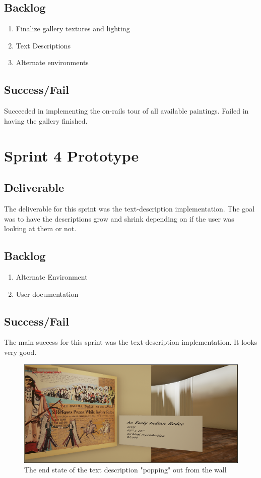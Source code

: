 \subsection{Backlog}
\begin{enumerate}
	\item Finalize gallery textures and lighting
	\item Text Descriptions
	\item Alternate environments
\end{enumerate}
\subsection{Success/Fail}
Succeeded in implementing the on-rails tour of all available paintings.  Failed in having the gallery finished.

\section{Sprint 4 Prototype}
\subsection{Deliverable}
The deliverable for this sprint was the text-description implementation.  The goal was to have the descriptions grow and shrink depending on if the user was looking at them or not.

\subsection{Backlog}
\begin{enumerate}
	\item Alternate Environment
	\item User documentation
\end{enumerate}
\subsection{Success/Fail}
The main success for this sprint was the text-description implementation.  It looks very good.
\begin{figure}
\centering
\includegraphics[scale=0.5]{Diagrams/textdescription.png}
\caption{The end state of the text description "popping" out from the wall}
\end{figure}

